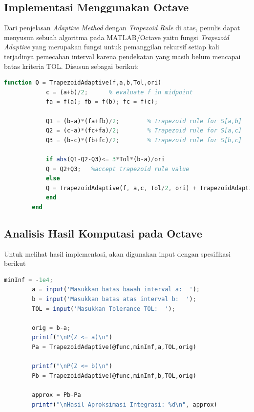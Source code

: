 \documentclass[journal,12pt,onecolumn,a4paper]{IEEEtran}
\begin{document}
\subsection{Implementasi Menggunakan Octave}

Dari penjelasan \emph{Adaptive Method} dengan \emph{Trapezoid Rule} di atas, penulis dapat menyusun sebuah algoritma pada MATLAB/Octave yaitu fungsi \emph{Trapezoid Adaptive} yang merupakan fungsi untuk pemanggilan rekursif setiap kali terjadinya pemecahan interval karena pendekatan yang masih belum mencapai batas kriteria TOL. Disusun sebagai berikut:
\begin{center}
	\begin{lstlisting}[language=Octave]
		function Q = TrapezoidAdaptive(f,a,b,Tol,ori)
			c = (a+b)/2;      % evaluate f in midpoint
			fa = f(a); fb = f(b); fc = f(c);
		
			Q1 = (b-a)*(fa+fb)/2;        % Trapezoid rule for S[a,b]
			Q2 = (c-a)*(fc+fa)/2;        % Trapezoid rule for S[a,c]
			Q3 = (b-c)*(fb+fc)/2;        % Trapezoid rule for S[b,c]
		
			if abs(Q1-Q2-Q3)<= 3*Tol*(b-a)/ori
			Q = Q2+Q3;   %accept trapezoid rule value
			else
			Q = TrapezoidAdaptive(f, a,c, Tol/2, ori) + TrapezoidAdaptive(f,c,b, Tol/2, ori); % use algorithm for [a,c] and [c,b]
			end
	  	end
	\end{lstlisting}
\end{center}

\subsection{Analisis Hasil Komputasi pada Octave}

Untuk melihat hasil implementasi, akan digunakan input dengan spesifikasi berikut

\begin{center}
	\begin{lstlisting}[language=Octave]
		minInf = -1e4;
		a = input('Masukkan batas bawah interval a:  ');
		b = input('Masukkan batas atas interval b:  ');
		TOL = input('Masukkan Tolerance TOL:  ');

		orig = b-a;
		printf("\nP(Z <= a)\n")
		Pa = TrapezoidAdaptive(@func,minInf,a,TOL,orig)

		printf("\nP(Z <= b)\n")
		Pb = TrapezoidAdaptive(@func,minInf,b,TOL,orig)

		approx = Pb-Pa
		printf("\nHasil Aproksimasi Integrasi: %d\n", approx)
	\end{lstlisting}
\end{center}
\end{document}

